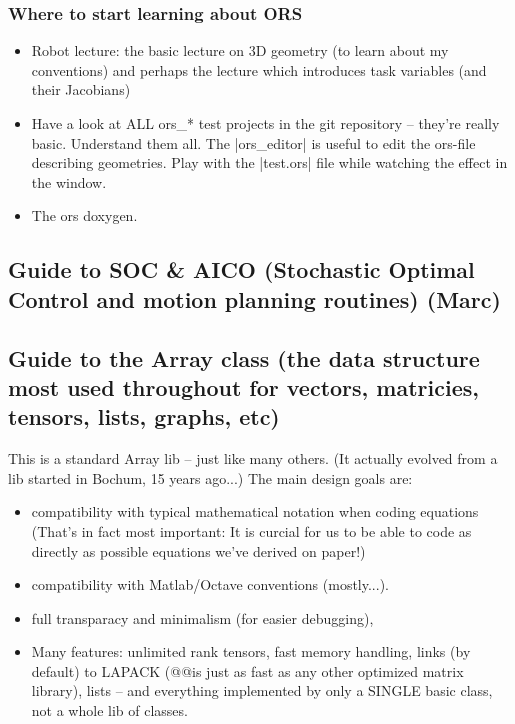 \subsubsection{Where to start learning about ORS}

\begin{itemize}
\item Robot lecture: the basic lecture on 3D geometry (to learn about my
conventions) and perhaps the lecture which introduces task variables
(and their Jacobians)

\item Have a look at ALL ors\_* test projects in the git repository --
they're really basic. Understand them all. The |ors_editor| is useful to
edit the ors-file describing geometries. Play with the |test.ors| file
while watching the effect in the window.

\item The ors doxygen.
\end{itemize}



\subsection{Guide to SOC \& AICO (Stochastic Optimal Control and motion
   planning routines) (Marc)}



\subsection{Guide to the Array class (the data structure most used throughout
   for vectors, matricies, tensors, lists, graphs, etc)}

This is a standard Array lib -- just like many others. (It actually
evolved from a lib started in Bochum, 15 years ago...) The main design
goals are: 

\begin{itemize}
\item compatibility with typical mathematical notation when coding
equations (That's in fact most important: It is curcial for us to be
able to code as directly as possible equations we've derived on
paper!)

\item compatibility with Matlab/Octave conventions (mostly...).

\item full transparacy and minimalism (for easier debugging),

\item Many features: unlimited rank tensors, fast memory handling, links
(by default) to LAPACK (@@is just as fast as any other
optimized matrix library), lists -- and everything implemented by only
a SINGLE basic class, not a whole lib of classes.
\end{itemize}

